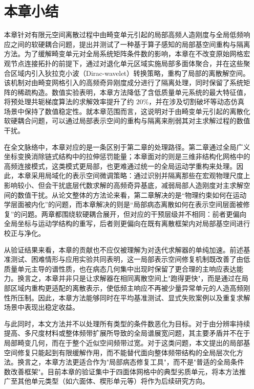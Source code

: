 \section{本章小结}

本章针对有限元空间离散过程中由畸变单元引起的局部高频人造刚度与全局低频响应之间的软硬耦合问题，提出并测试了一种基于算子感知的局部基空间重构与隔离方法。为了缓解畸变单元对全局系统矩阵条件数的影响，本章在不改变原始网格宏观节点连接拓扑的前提下，通过对退化单元区域实施局部多面体聚合，并在这些聚合区域内引入狄拉克小波（Dirac-wavelet）转换策略，重构了局部的离散解空间。该机制对由畸变网格引入的高频奇异刚度成分进行了隔离处理，同时保留了系统矩阵的稀疏构造。数值实验表明，本章方法降低了含低质量单元系统的最大特征值，将预处理共轭梯度算法的求解效率提升了约 $20\%$，并在涉及切割破坏等动态仿真场景中保持了数值稳定性。就本章范围而言，这说明对于由畸变单元引起的离散化软硬耦合问题，可以通过局部表示空间的重构与隔离来削弱其对主求解过程的数值干扰。

在全文脉络中，本章对应的是一条区别于第二章的处理路径。第二章通过全局广义坐标变换消除链式结构中的拉伸惩罚能量；本章面对的则是三维非结构化网格中的高频连接模式，这类模式更局部，也更难通过统一的全局运动学重构来处理。因此，本章采用局域化的表示空间微调策略：通过识别并隔离那些在宏观物理尺度上影响较小、但会干扰底层代数求解的高频奇异基底，减弱局部人造刚度对主求解空间的数值干扰。从论文整体的方法论来看，第二章解决的是“物理约束如何在运动学层面被内化”的问题，而本章解决的则是“局部病态离散如何在表示空间层面被修复”的问题。两章都围绕软硬耦合展开，但对应的干预层级并不相同：前者更偏向全局坐标与运动学结构的重写，后者则更偏向在既有离散框架内对局部基空间进行校正与净化。

从验证结果来看，本章的贡献也不应仅被理解为对迭代求解器的单纯加速。前述基准测试、困难情形与应用实验共同表明，这一局部表示空间修复机制既改善了由低质量单元主导的谱性质，也在病态几何集中出现时保留了更合理的主响应表达能力。换言之，本章并非只是让求解器在相同离散空间上"跑得更快"，而是通过在局部区域内重构更适配的离散表示，使低频主响应不再被少量异常单元的人造高频刚性所压制。因此，本章方法能够同时在平均基准测试、显式失败案例以及重复求解场景中表现出稳定收益。

与此同时，本文方法并不以处理所有类型的条件数恶化为目标。对于由分辨率持续提高、多尺度材料或整体频带扩展所导致的全局谱展宽问题，其主要矛盾并不在于局部畸变几何，而在于整个近似空间频带过宽。对于这类问题，本文提出的局部基空间修复只能起到有限缓解作用，而不能替代面向整体频带结构的全局层次化方法。换言之，本章方法更适合作为"局部病态修复工具"，而不是"普适的全局条件数改善框架"。目前本章的验证集中于四面体网格中的典型劣质单元，将本方法推广至其他单元类型（如六面体、楔形单元等）将作为后续研究方向。

